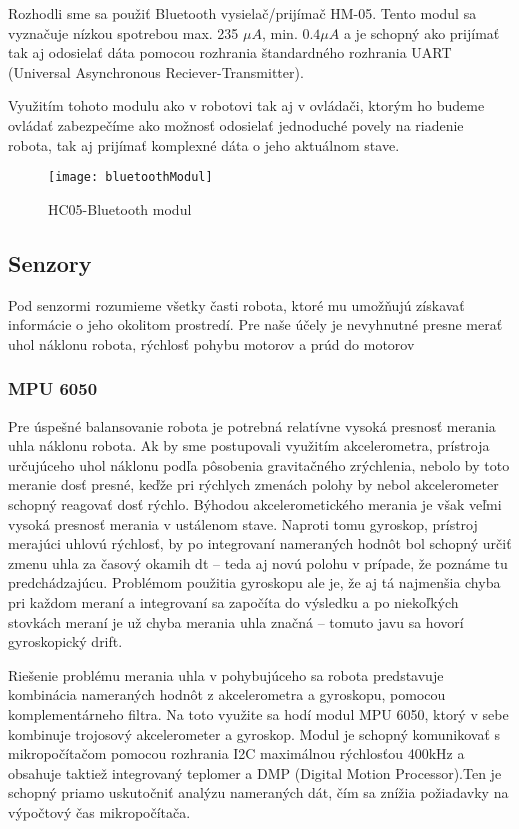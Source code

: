 Rozhodli sme sa použiť Bluetooth vysielač/prijímač HM-05. Tento modul sa vyznačuje nízkou spotrebou max. 235 $\mu A$, min. $0.4\mu A$ a je schopný ako prijímať tak aj odosielať dáta pomocou rozhrania štandardného rozhrania UART (Universal Asynchronous Reciever-Transmitter). 

Využitím tohoto modulu ako v robotovi tak aj v ovládači, ktorým ho budeme ovládať zabezpečíme ako možnosť odosielať jednoduché povely na riadenie robota, tak aj prijímať komplexné dáta o jeho aktuálnom stave.

\begin{figure}
\centering
\texttt{[image: bluetoothModul]}
\caption{HC05-Bluetooth modul}
\label{fig:bluetoothModul}
\end{figure}

\subsection{Senzory}
Pod senzormi rozumieme všetky časti robota, ktoré mu umožňujú získavať informácie o jeho okolitom prostredí. Pre naše účely je nevyhnutné presne merať uhol náklonu robota, rýchlosť pohybu motorov a prúd do motorov

\subsubsection{MPU 6050}
Pre úspešné balansovanie robota je potrebná relatívne vysoká presnosť merania uhla náklonu robota. Ak by sme postupovali využitím akcelerometra, prístroja určujúceho uhol náklonu podľa pôsobenia gravitačného zrýchlenia, nebolo by toto meranie dosť presné, keďže pri rýchlych zmenách polohy by nebol akcelerometer schopný reagovať dosť rýchlo. Býhodou akcelerometického merania je však veľmi vysoká presnosť merania v ustálenom stave. Naproti tomu gyroskop, prístroj merajúci uhlovú rýchlosť, by po integrovaní nameraných hodnôt bol schopný určiť zmenu uhla za časový okamih dt – teda aj novú polohu v prípade, že poznáme tu predchádzajúcu. Problémom použitia gyroskopu ale je, že aj tá najmenšia chyba pri každom meraní a integrovaní sa započíta do výsledku a po niekoľkých stovkách meraní je už chyba merania uhla značná – tomuto javu sa hovorí gyroskopický drift. 

Riešenie problému merania uhla v pohybujúceho sa robota predstavuje kombinácia nameraných hodnôt z akcelerometra a gyroskopu, pomocou komplementárneho filtra. Na toto využite sa hodí modul MPU 6050, ktorý v sebe kombinuje trojosový akcelerometer a gyroskop. Modul je schopný komunikovať s mikropočítačom pomocou rozhrania I2C maximálnou rýchlosťou 400kHz a obsahuje taktiež integrovaný teplomer a DMP (Digital Motion Processor).Ten je schopný priamo uskutočniť analýzu nameraných dát, čím sa znížia požiadavky na výpočtový čas mikropočítača.

